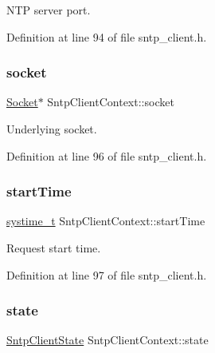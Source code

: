 N\+TP server port. 



Definition at line 94 of file sntp\+\_\+client.\+h.

\mbox{\label{structSntpClientContext_aa81b4c38e5803188b89f1d13473235b0}} 
\subsubsection{\texorpdfstring{socket}{socket}}
{\footnotesize\ttfamily \hyperlink{socket_8h_aa85acfb0fa336ef495e6ba87fb88fc48}{Socket}$\ast$ Sntp\+Client\+Context\+::socket}



Underlying socket. 



Definition at line 96 of file sntp\+\_\+client.\+h.

\mbox{\label{structSntpClientContext_ae6aa657a6ac2d5a76fc8e026066fa77c}} 
\subsubsection{\texorpdfstring{start\+Time}{startTime}}
{\footnotesize\ttfamily \hyperlink{compiler__port_8h_ae3e32a98d431a02106616da3071832dd}{systime\+\_\+t} Sntp\+Client\+Context\+::start\+Time}



Request start time. 



Definition at line 97 of file sntp\+\_\+client.\+h.

\mbox{\label{structSntpClientContext_af141be1c1ac01635b9788482dc791184}} 
\subsubsection{\texorpdfstring{state}{state}}
{\footnotesize\ttfamily \hyperlink{sntp__client_8h_aeca73741bdca77b9eb50411f0c77136d}{Sntp\+Client\+State} Sntp\+Client\+Context\+::state}




